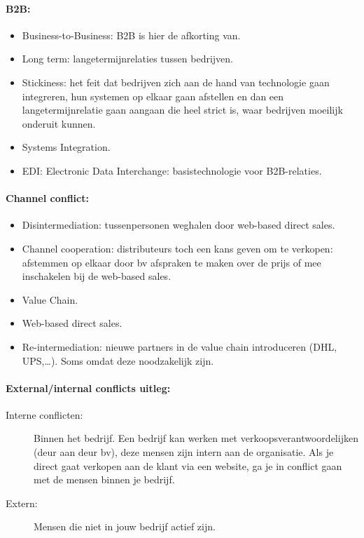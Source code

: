 \documentclass[10pt,a4paper]{report}
\begin{document}
\paragraph{B2B:}
\begin{itemize}
\item Business-to-Business: B2B is hier de afkorting van.
\item Long term: langetermijnrelaties tussen bedrijven.
\item Stickiness: het feit dat bedrijven zich aan de hand van technologie gaan integreren, hun systemen op elkaar gaan afstellen en dan een langetermijnrelatie gaan aangaan die heel strict is, waar bedrijven moeilijk onderuit kunnen.
\item Systems Integration.
\item EDI: Electronic Data Interchange: basistechnologie voor B2B-relaties.
\end{itemize}

\paragraph{Channel conflict:}
\begin{itemize}
\item Disintermediation: tussenpersonen weghalen door web-based direct sales.
\item Channel cooperation: distributeurs toch een kans geven om te verkopen: afstemmen op elkaar door bv afspraken te maken over de prijs of mee inschakelen bij de web-based sales.
\item Value Chain.
\item Web-based direct sales.
\item Re-intermediation: nieuwe partners in de value chain introduceren (DHL, UPS,…). Soms omdat deze noodzakelijk zijn.
\end{itemize}

\paragraph{External/internal conflicts uitleg:} 
\begin{description}
\item[Interne conflicten:]Binnen het bedrijf. Een bedrijf kan werken met verkoopsverantwoordelijken (deur aan deur bv), deze mensen zijn intern aan de organisatie. Als je direct gaat verkopen aan de klant via een website, ga je in conflict gaan met de mensen binnen je bedrijf.
\item[Extern:]Mensen die niet in jouw bedrijf actief zijn.
\end{description}
\end{document}
